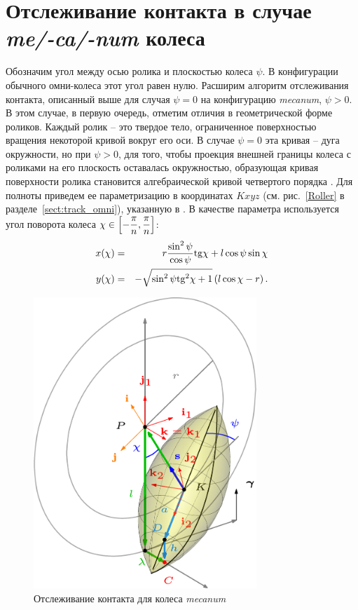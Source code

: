 \section{Отслеживание контакта в случае \textit{me/-ca/-num} колеса}\label{sect:track_mecanum}

Обозначим угол между осью ролика и плоскостью колеса $\psi$. В конфигурации обычного омни-колеса этот угол равен нулю. Расширим алгоритм отслеживания контакта, описанный выше для случая $\psi = 0$ на конфигурацию \textit{mecanum}, $\psi > 0$. В этом случае, в первую очередь, отметим отличия в геометрической форме роликов. Каждый ролик -- это твердое тело, ограниченное поверхностью вращения некоторой кривой вокруг его оси. В случае $\psi = 0$ эта кривая -- дуга окружности, но при $\psi > 0$, для того, чтобы проекция внешней границы колеса с роликами на его плоскость оставалась окружностью, образующая кривая поверхности ролика становится алгебраической кривой четвертого порядка \cite{Gfrerrer2008}. Для полноты приведем ее параметризацию в координатах $Kxyz$ (см. рис.~\ref{Roller} в разделе~\ref{sect:track_omni}), указанную в \cite{Gfrerrer2008}. В качестве параметра используется угол поворота колеса $\chi \in \left[ -\displaystyle\frac{\displaystyle \pi}{\displaystyle n}, \displaystyle\frac{\displaystyle \pi}{\displaystyle n} \right]$:
\begin{eqnarray*}
    x(\chi) & = & r\displaystyle\frac{\displaystyle \sin^2\psi}{\displaystyle \cos\psi}\mathrm{tg}\chi + l\cos\psi\sin\chi \\
    y(\chi) & = & -\sqrt{\sin^2\psi\mathrm{tg}^2\chi + 1}\left(l\cos\chi - r\right).
\end{eqnarray*}

\begin{figure}[H]
    \centering
    \includegraphics[width=0.75\textwidth]{./content/pic/asy/pic_mecanum.png}
    \caption{Отслеживание контакта для колеса \textit{mecanum}}
    \label{fig:mecanum}
\end{figure}

